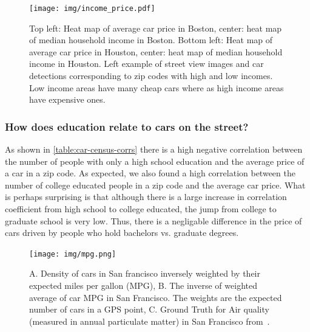 \documentclass[10pt,twocolumn,letterpaper]{article}
\begin{document}
\begin{figure}[t]
\begin{center}
    \texttt{[image: img/income\_price.pdf]}
\end{center}
   \caption {Top left: Heat map of average car price in Boston, center: heat map of median household income in Boston. Bottom left: Heat map of average car price in Houston, center: heat map of median household income in Houston. Left example of street view images and car detections corresponding to zip codes with high and low incomes. Low income areas have many cheap cars where as high income areas have expensive ones.}
\label{fig:bos-sf-vis}
\end{figure}

\subsubsection{How does education relate to cars on the street?}
As shown in \ref{table:car-census-corrs} there is a high negative correlation between the number of people with only a high school education and the average price of a car in a zip code. As expected, we also found a high correlation between the number of college educated people in a zip code and the average car price. What is perhaps surprising is that although there is a large increase in correlation coefficient from high school to college educated, the jump from college to graduate school is very low. Thus, there is a negligable difference in the price of cars driven by people who hold bachelors vs. graduate degrees.

\begin{figure}[t]
\begin{center}
    \texttt{[image: img/mpg.png]}
\end{center}
   \caption {A. Density of cars in San francisco inversely weighted by their expected miles per gallon (MPG), B. The inverse of weighted average of car MPG in San Francisco. The weights are the expected number of cars in a GPS point, C. Ground Truth for Air quality (measured in annual particulate matter) in San Francisco from~\cite{ground_air}.}
\label{fig:pollution}
\end{figure}
\end{document}
